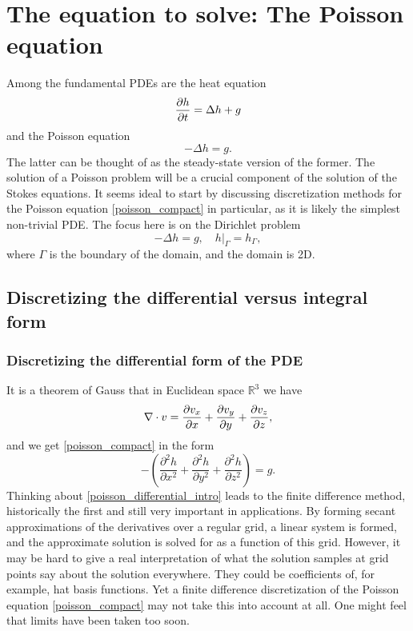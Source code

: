 \section{The equation to solve: The Poisson equation}

Among the fundamental PDEs
are the heat equation
    $$\frac{\partial h}{\partial t} = \Delta h + g$$
and the Poisson equation
\begin{equation}\label{poisson_compact}
    -\Delta h = g.
\end{equation}
The latter can be thought of as the steady-state version of the former. The solution of a Poisson problem will be a crucial component
of the solution of the Stokes equations. It seems ideal to start by discussing
discretization methods for the Poisson equation \eqref{poisson_compact} in particular,
as it is likely the simplest non-trivial PDE.
The focus here is on the Dirichlet problem
\begin{equation}\label{poisson_dirichlet_problem}
    -\Delta h = g, \quad \left.h\right|_{\Gamma} = h_\Gamma,
\end{equation}
where $\Gamma$ is the boundary of the domain, and the domain is 2D.

\subsection{Discretizing the differential versus integral form}
\subsubsection{Discretizing the differential form of the PDE}
It is a theorem of Gauss that in Euclidean space $\mathbb{R}^3$ we have
\begin{equation}\label{gauss_euclidean_divergence}
    \nabla \cdot v = \frac{\partial v_x}{\partial x} + \frac{\partial v_y}{\partial y} + \frac{\partial v_z}{\partial z},
\end{equation}
and we get \eqref{poisson_compact} in the form
\begin{equation}\label{poisson_differential_intro}
    -\left(\frac{\partial^2 h}{\partial x^2}
           +\frac{\partial^2 h}{\partial y^2}
           +\frac{\partial^2 h}{\partial z^2}\right) = g.
\end{equation}
Thinking about \eqref{poisson_differential_intro} leads to the finite difference method, historically the first and
still very important in applications.
By forming secant approximations of the derivatives over a regular grid, a linear system is formed, and the approximate solution is solved
for as a function of this grid.
However, it may be hard to give a real interpretation of what the solution samples at grid points say about the solution everywhere.
They could be coefficients of, for example, hat basis functions.
Yet a finite difference discretization of the Poisson equation \eqref{poisson_compact} may not take this into account at all. One might feel that
limits have been taken too soon.


